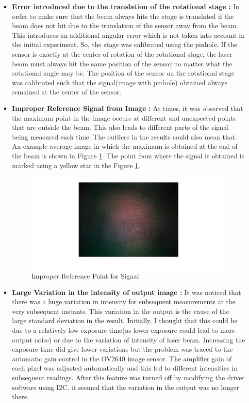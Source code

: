 \begin{itemize}
\item \textbf{Error introduced due to the translation of the rotational stage :} In order to make sure that the beam always hits the stage is translated if the beam does not hit due to the translation of the sensor away from the beam. This introduces an additional angular error which is not taken into account in the initial experiment. So, the stage was calibrated using the pinhole. If the sensor is exactly at the center of rotation of the rotational stage, the laser beam must always hit the same position of the sensor no matter what the rotational angle may be. The position of the sensor on the rotational stage was calibrated such that the signal(image with pinhole) obtained always remained at the center of the sensor. 

\item \textbf{Improper Reference Signal from Image :} At times, it was observed that the maximum point in the image occurs at different and unexpected points that are outside the beam. This also leads to different parts of the signal being measured each time. The outliers in the results could also mean that. An example average image in which the maximum is obtained at the end of the beam is shown in Figure \ref{fig:exp_acc_improper}. The point from where the signal is obtained is marked using a yellow star in the Figure \ref{fig:exp_acc_improper}.
\begin{figure}[ht]
\centering
\includegraphics[scale=0.50]{pics/ImproperDetection.jpg}
\caption{Improper Reference Point for Signal}
\label{fig:exp_acc_improper}
\end{figure}
\item \textbf{Large Variation in the intensity of output image :} It was noticed that there was a huge variation in intensity for subsequent measurements at the very subsequent instants. This variation in the output is the cause of the large standard deviation in the result. Initially, I thought that this could be due to a relatively low exposure time(as lower exposure could lead to more output noise) or due to the variation of intensity of laser beam. Increasing the exposure time did give lower variations but the problem was traced to the automatic gain control in the OV2640 image sensor. The amplifier gain of each pixel was adjusted automatically and this led to different intensities in subsequent readings. After this feature was turned off by modifying the driver software using I2C, it seemed that the variation in the output was no longer there.


\end{itemize}

